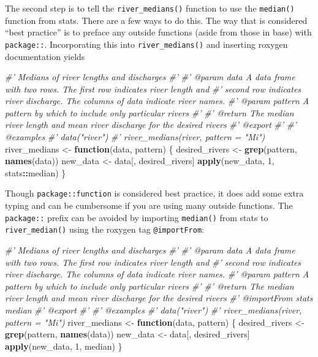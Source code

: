 \documentclass[
]{book}
\newenvironment{Shaded}{\begin{snugshade}}{\end{snugshade}}
\newcommand{\CommentTok}[1]{\textcolor[rgb]{0.56,0.35,0.01}{\textit{#1}}}
\newcommand{\ControlFlowTok}[1]{\textcolor[rgb]{0.13,0.29,0.53}{\textbf{#1}}}
\newcommand{\DecValTok}[1]{\textcolor[rgb]{0.00,0.00,0.81}{#1}}
\newcommand{\KeywordTok}[1]{\textcolor[rgb]{0.13,0.29,0.53}{\textbf{#1}}}
\newcommand{\NormalTok}[1]{#1}
\newcommand{\OperatorTok}[1]{\textcolor[rgb]{0.81,0.36,0.00}{\textbf{#1}}}
\newcommand{\StringTok}[1]{\textcolor[rgb]{0.31,0.60,0.02}{#1}}
\begin{document}
The second step is to tell the \texttt{river\_medians()} function to use the \texttt{median()} function from stats. There are a few ways to do this. The way that is considered ``best practice'' is to preface any outside functions (aside from those in base) with \texttt{package::}. Incorporating this into \texttt{river\_medians()} and inserting roxygen documentation yields

\begin{Shaded}
\begin{Highlighting}[]
\CommentTok{#' Medians of river lengths and discharges}
\CommentTok{#'}
\CommentTok{#' @param data A data frame with two rows. The first row indicates river length and}
\CommentTok{#'   second row indicates river discharge. The columns of data indicate river names.}
\CommentTok{#' @param pattern A pattern by which to include only particular rivers}
\CommentTok{#'}
\CommentTok{#' @return The median river length and mean river discharge for the desired rivers}
\CommentTok{#' @export}
\CommentTok{#'}
\CommentTok{#' @examples}
\CommentTok{#' data("river")}
\CommentTok{#' river_medians(river, pattern = "Mi")}
\NormalTok{river_medians <-}\StringTok{ }\ControlFlowTok{function}\NormalTok{(data, pattern) \{}
\NormalTok{  desired_rivers <-}\StringTok{ }\KeywordTok{grep}\NormalTok{(pattern, }\KeywordTok{names}\NormalTok{(data))}
\NormalTok{  new_data <-}\StringTok{ }\NormalTok{data[, desired_rivers]}
  \KeywordTok{apply}\NormalTok{(new_data, }\DecValTok{1}\NormalTok{, stats}\OperatorTok{::}\NormalTok{median)}
\NormalTok{\}}
\end{Highlighting}
\end{Shaded}

Though \texttt{package::function} is considered best practice, it does add some extra typing and can be cumbersome if you are using many outside functions. The \texttt{package::} prefix can be avoided by importing \texttt{median()} from stats to \texttt{river\_median()} using the roxygen tag \texttt{@importFrom}:

\begin{Shaded}
\begin{Highlighting}[]
\CommentTok{#' Medians of river lengths and discharges}
\CommentTok{#'}
\CommentTok{#' @param data A data frame with two rows. The first row indicates river length and}
\CommentTok{#'   second row indicates river discharge. The columns of data indicate river names.}
\CommentTok{#' @param pattern A pattern by which to include only particular rivers}
\CommentTok{#'}
\CommentTok{#' @return The median river length and mean river discharge for the desired rivers}
\CommentTok{#' @importFrom stats median}
\CommentTok{#' @export}
\CommentTok{#'}
\CommentTok{#' @examples}
\CommentTok{#' data("river")}
\CommentTok{#' river_medians(river, pattern = "Mi")}
\NormalTok{river_medians <-}\StringTok{ }\ControlFlowTok{function}\NormalTok{(data, pattern) \{}
\NormalTok{  desired_rivers <-}\StringTok{ }\KeywordTok{grep}\NormalTok{(pattern, }\KeywordTok{names}\NormalTok{(data))}
\NormalTok{  new_data <-}\StringTok{ }\NormalTok{data[, desired_rivers]}
  \KeywordTok{apply}\NormalTok{(new_data, }\DecValTok{1}\NormalTok{, median)}
\NormalTok{\}}
\end{Highlighting}
\end{Shaded}
\end{document}
